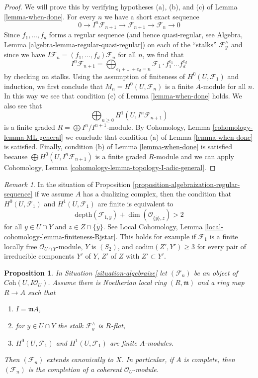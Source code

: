 \documentclass{stacks-project}
\theoremstyle{plain}
\newtheorem{proposition}[subsection]{Proposition}
\theoremstyle{definition}
\theoremstyle{remark}
\newtheorem{remark}[subsection]{Remark}
\numberwithin{equation}{subsection}
\begin{document}
\begin{proof}
We will prove this by verifying hypotheses (a), (b), and (c) of
Lemma \ref{lemma-when-done}.
For every $n$ we have a short exact sequence
$$
0 \to I^n\mathcal{F}_{n + 1} \to \mathcal{F}_{n + 1} \to \mathcal{F}_n \to 0
$$
Since $f_1, \ldots, f_d$ forms a regular sequence (and hence
quasi-regular, see Algebra, Lemma \ref{algebra-lemma-regular-quasi-regular})
on each of the ``stalks'' $\mathcal{F}_y^\wedge$ and since we have
$I\mathcal{F}_n = (f_1, \ldots, f_d)\mathcal{F}_n$ for all $n$,
we find that
$$
I^n\mathcal{F}_{n + 1} =
\bigoplus\nolimits_{e_1 + \ldots + e_d = n} \mathcal{F}_1 \cdot
f_1^{e_1} \ldots f_d^{e_d}
$$
by checking on stalks. Using the assumption of finiteness of
$H^0(U, \mathcal{F}_1)$ and induction, we first conclude that
$M_n = H^0(U, \mathcal{F}_n)$ is a finite $A$-module for all $n$.
In this way we see that condition (c) of Lemma \ref{lemma-when-done} holds.
We also see that
$$
\bigoplus\nolimits_{n \geq 0} H^1(U, I^n\mathcal{F}_{n + 1})
$$
is a finite graded $R = \bigoplus I^n/I^{n +1}$-module.
By Cohomology, Lemma \ref{cohomology-lemma-ML-general}
we conclude that condition (a) of
Lemma \ref{lemma-when-done} is satisfied. Finally, condition (b) of
Lemma \ref{lemma-when-done} is satisfied because
$\bigoplus H^0(U, I^n\mathcal{F}_{n + 1})$ is a finite graded $R$-module
and we can apply
Cohomology, Lemma \ref{cohomology-lemma-topology-I-adic-general}.
\end{proof}

\begin{remark}
\label{remark-interesting-case-ter}
In the situation of
Proposition \ref{proposition-algebraization-regular-sequence}
if we assume $A$ has a dualizing complex, then
the condition that $H^0(U, \mathcal{F}_1)$ and
$H^1(U, \mathcal{F}_1)$ are finite is equivalent to
$$
\text{depth}(\mathcal{F}_{1, y}) +
\dim(\mathcal{O}_{\overline{\{y\}}, z}) > 2
$$
for all $y \in U \cap Y$ and $z \in Z \cap \overline{\{y\}}$.
See Local Cohomology, Lemma \ref{local-cohomology-lemma-finiteness-Rjstar}.
This holds for example if $\mathcal{F}_1$ is a finite locally free
$\mathcal{O}_{U \cap Y}$-module, $Y$ is $(S_2)$, and
$\text{codim}(Z', Y') \geq 3$ for every pair of irreducible components
$Y'$ of $Y$, $Z'$ of $Z$ with $Z' \subset Y'$.
\end{remark}

\begin{proposition}
\label{proposition-algebraization-flat}
In Situation \ref{situation-algebraize} let
$(\mathcal{F}_n)$ be an object of $\textit{Coh}(U, I\mathcal{O}_U)$.
Assume there is Noetherian local ring $(R, \mathfrak m)$ and a ring
map $R \to A$ such that
\begin{enumerate}
\item $I = \mathfrak m A$,
\item for $y \in U \cap Y$ the stalk $\mathcal{F}_y^\wedge$ is $R$-flat,
\item $H^0(U, \mathcal{F}_1)$ and $H^1(U, \mathcal{F}_1)$ are finite
$A$-modules.
\end{enumerate}
Then $(\mathcal{F}_n)$ extends canonically to $X$. In particular, if $A$
is complete, then $(\mathcal{F}_n)$ is the completion of a coherent
$\mathcal{O}_U$-module.
\end{proposition}
\end{document}
